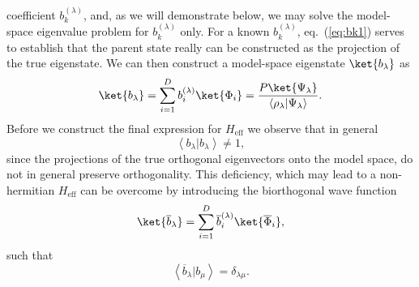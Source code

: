 coefficient $b_k^{(\lambda )}$, and, as we will 
demonstrate below, we may solve the model-space eigenvalue
problem for $b_k^{(\lambda )}$ only. For a known $b_k^{(\lambda )}$, 
eq.\ (\ref{eq:bk1}) serves to establish that the parent state 
really can be constructed as the projection of the true eigenstate. We can
then construct a model-space eigenstate $\ket{b_{\lambda}}$ as
\begin{equation}
\ket{b_{\lambda}}=\sum_{i=1}^{D}b_i^{(\lambda )}\ket{\Phi_i}=
\frac{P\ket{\Psi_{\lambda}}}
{\left\langle\rho_{\lambda} | \Psi_{\lambda} \right\rangle}.
\label{wfb}
\end{equation}
Before we construct the final expression 
for $H_{\mathrm{eff}}$ we observe that in general
\begin{equation}
{\left\langle b_{\lambda} | b_{\lambda} \right\rangle}\neq 1,
\end{equation}
since the projections of the true orthogonal eigenvectors onto the 
model space, do not in general preserve 
orthogonality. This deficiency, which
may lead to a non-hermitian $H_{\mathrm{eff}}$ 
can be overcome by introducing the 
biorthogonal wave function
\begin{equation}
\ket{\overline{b}_{\lambda}}=\sum_{i=1}^{D}\overline{b}_i^{(\lambda )}
\ket{\overline{\Phi}_i},
\label{wfbi}
\end{equation}
such that 
\begin{equation}
{\left\langle \overline{b}_{\lambda} | b_{\mu} \right\rangle}=
\delta_{\lambda\mu}.
\end{equation}

